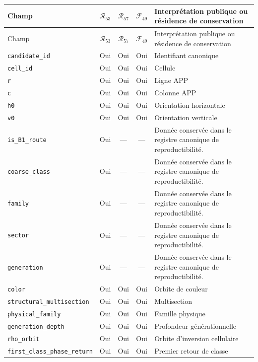 \begingroup
\small
\useOriginalUrlSetting
\setlength{\LTpre}{0.5\baselineskip}
\setlength{\LTpost}{0.5\baselineskip}
\begin{longtable}{p{}ccc p{}}
\hline
Champ & \(\mathcal R_{53}\) & \(\mathcal R_{57}\) & \(\mathcal F_{49}\) & Interprétation publique ou résidence de conservation \\
\hline
\endfirsthead
\hline
Champ & \(\mathcal R_{53}\) & \(\mathcal R_{57}\) & \(\mathcal F_{49}\) & Interprétation publique ou résidence de conservation \\
\hline
\endhead
\nolinkurl{candidate_id} & Oui & Oui & Oui & Identifiant canonique \\
\nolinkurl{cell_id} & Oui & Oui & Oui & Cellule \\
\nolinkurl{r} & Oui & Oui & Oui & Ligne APP \\
\nolinkurl{c} & Oui & Oui & Oui & Colonne APP \\
\nolinkurl{h0} & Oui & Oui & Oui & Orientation horizontale \\
\nolinkurl{v0} & Oui & Oui & Oui & Orientation verticale \\
\nolinkurl{is_B1_route} & Oui & --- & --- & Donnée conservée dans le registre canonique de reproductibilité. \\
\nolinkurl{coarse_class} & Oui & --- & --- & Donnée conservée dans le registre canonique de reproductibilité. \\
\nolinkurl{family} & Oui & --- & --- & Donnée conservée dans le registre canonique de reproductibilité. \\
\nolinkurl{sector} & Oui & --- & --- & Donnée conservée dans le registre canonique de reproductibilité. \\
\nolinkurl{generation} & Oui & --- & --- & Donnée conservée dans le registre canonique de reproductibilité. \\
\nolinkurl{color} & Oui & Oui & Oui & Orbite de couleur \\
\nolinkurl{structural_multisection} & Oui & Oui & Oui & Multisection \\
\nolinkurl{physical_family} & Oui & Oui & Oui & Famille physique \\
\nolinkurl{generation_depth} & Oui & Oui & Oui & Profondeur générationnelle \\
\nolinkurl{rho_orbit} & Oui & Oui & Oui & Orbite d'inversion cellulaire \\
\nolinkurl{first_class_phase_return} & Oui & Oui & Oui & Premier retour de classe \\

\end{longtable}
